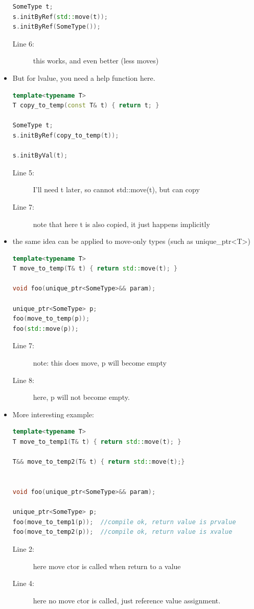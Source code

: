 \documentclass[a4paper,11pt,twoside]{book}
\begin{document}
\begin{itemize}
\begin{lstlisting}[frame=single, language=c++]
SomeType t;
s.initByRef(std::move(t)); 
s.initByRef(SomeType()); 
\end{lstlisting}
\begin{description}
	\item[Line 6:] this works, and even better (less moves)
\end{description}

\item But for lvalue, you need a help function here.
\begin{lstlisting}[frame=single, language=c++]
template<typename T>
T copy_to_temp(const T& t) { return t; }

SomeType t; 
s.initByRef(copy_to_temp(t)); 

s.initByVal(t); 
\end{lstlisting}
\begin{description}
	\item[Line 5:] I'll need t later, so cannot std::move(t), but can copy
	\item[Line 7:] note that here t is also copied, it just happens implicitly
\end{description}

\item the same idea can be applied to move-only types (such as unique\_ptr<T>)
\begin{lstlisting}[frame=single, language=c++]
template<typename T>
T move_to_temp(T& t) { return std::move(t); }

void foo(unique_ptr<SomeType>&& param);

unique_ptr<SomeType> p;
foo(move_to_temp(p)); 
foo(std::move(p)); 
\end{lstlisting}
\begin{description}
	\item[Line 7:] note: this does move, p will become empty
	\item[Line 8:] here, p will not become empty. 
\end{description}


\item More interesting example:
\begin{lstlisting}[frame=single, language=c++]
template<typename T>
T move_to_temp1(T& t) { return std::move(t); }

T&& move_to_temp2(T& t) { return std::move(t);}


void foo(unique_ptr<SomeType>&& param);

unique_ptr<SomeType> p;
foo(move_to_temp1(p));  //compile ok, return value is prvalue
foo(move_to_temp2(p));  //compile ok, return value is xvalue
\end{lstlisting}
\begin{description}
	\item[Line 2:] here move ctor is called when return to a value
	\item[Line 4:] here no move ctor is called, just reference value assignment.
\end{description}



\end{itemize}
\end{document}
